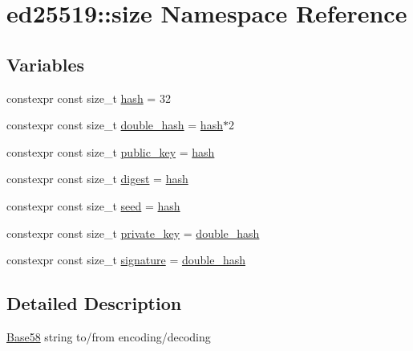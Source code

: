 \hypertarget{namespaceed25519_1_1size}{}\section{ed25519\+::size Namespace Reference}
\label{namespaceed25519_1_1size}
\subsection*{Variables}
\begin{DoxyCompactItemize}
\item 
constexpr const size\+\_\+t \mbox{\hyperlink{namespaceed25519_1_1size_a0c20525cc9711076ec093177a8e36c25}{hash}} = 32
\item 
constexpr const size\+\_\+t \mbox{\hyperlink{namespaceed25519_1_1size_ac853f864bb12792f88647a998c3c030f}{double\+\_\+hash}} = \mbox{\hyperlink{namespaceed25519_1_1size_a0c20525cc9711076ec093177a8e36c25}{hash}}$\ast$2
\item 
constexpr const size\+\_\+t \mbox{\hyperlink{namespaceed25519_1_1size_a8f8f1706b7e101ddc858ad26bdc010eb}{public\+\_\+key}} = \mbox{\hyperlink{namespaceed25519_1_1size_a0c20525cc9711076ec093177a8e36c25}{hash}}
\item 
constexpr const size\+\_\+t \mbox{\hyperlink{namespaceed25519_1_1size_ab3443d829236034a3824204b295de4d0}{digest}} = \mbox{\hyperlink{namespaceed25519_1_1size_a0c20525cc9711076ec093177a8e36c25}{hash}}
\item 
constexpr const size\+\_\+t \mbox{\hyperlink{namespaceed25519_1_1size_a25303466af2d7379e9ceb5955dd70b57}{seed}} = \mbox{\hyperlink{namespaceed25519_1_1size_a0c20525cc9711076ec093177a8e36c25}{hash}}
\item 
constexpr const size\+\_\+t \mbox{\hyperlink{namespaceed25519_1_1size_a2e21f8a4af0331d49145f1893a441eed}{private\+\_\+key}} = \mbox{\hyperlink{namespaceed25519_1_1size_ac853f864bb12792f88647a998c3c030f}{double\+\_\+hash}}
\item 
constexpr const size\+\_\+t \mbox{\hyperlink{namespaceed25519_1_1size_adefacb85c80ee8d51c482044e6d79a26}{signature}} = \mbox{\hyperlink{namespaceed25519_1_1size_ac853f864bb12792f88647a998c3c030f}{double\+\_\+hash}}
\end{DoxyCompactItemize}


\subsection{Detailed Description}
\mbox{\hyperlink{classed25519_1_1_base58}{Base58}} string to/from encoding/decoding 


